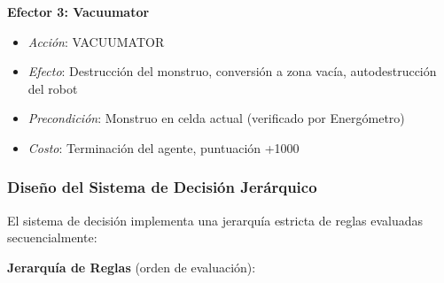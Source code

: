 \documentclass[10pt,twocolumn]{article}
\begin{document}
\textbf{Efector 3: Vacuumator}
\begin{itemize}
\item \textit{Acción}: VACUUMATOR
\item \textit{Efecto}: Destrucción del monstruo, conversión a zona vacía, autodestrucción del robot
\item \textit{Precondición}: Monstruo en celda actual (verificado por Energómetro)
\item \textit{Costo}: Terminación del agente, puntuación +1000
\end{itemize}

\subsubsection{Diseño del Sistema de Decisión Jerárquico}

El sistema de decisión implementa una jerarquía estricta de reglas evaluadas secuencialmente:

\textbf{Jerarquía de Reglas} (orden de evaluación):
\end{document}
